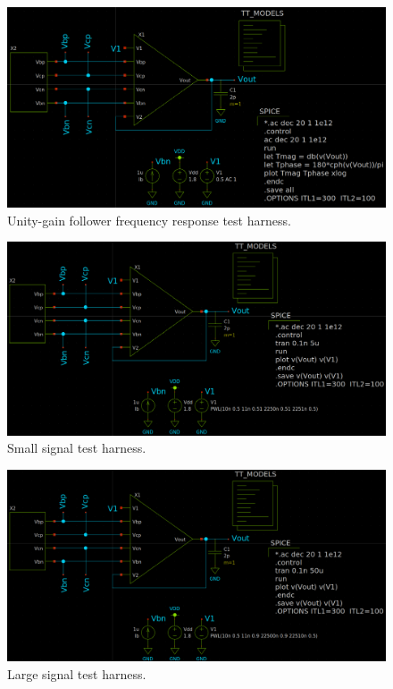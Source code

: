 \documentclass[11pt]{article}
\begin{document}
    \begin{figure}[!ht]
        \centering
        \includegraphics[width=.90\linewidth]{../img/ac.png}
        \caption{Unity-gain follower frequency response test harness.}
        \label{fig:ac}
    \end{figure}
    \begin{figure}[!ht]
        \centering
        \includegraphics[width=.90\linewidth]{../img/ssig.png}
        \caption{Small signal test harness.}
        \label{fig:ssig}
    \end{figure}
    \begin{figure}[!ht]
        \centering
        \includegraphics[width=.90\linewidth]{../img/lsig.png}
        \caption{Large signal test harness.}
        \label{fig:lsig}
    \end{figure}
    
\end{document}
